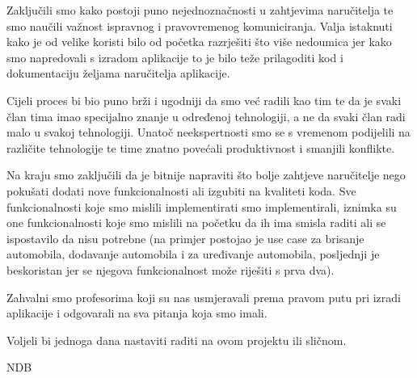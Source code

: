 		Zaključili smo kako postoji puno nejednoznačnosti u zahtjevima naručitelja te smo naučili važnost ispravnog i pravovremenog komuniciranja. Valja istaknuti kako je od velike koristi bilo od početka razrješiti što više nedoumica jer kako smo napredovali s izradom aplikacije to je bilo teže prilagoditi kod i dokumentaciju željama naručitelja aplikacije.\newline
		
		Cijeli proces bi bio puno brži i ugodniji da smo već radili kao tim te da je svaki član tima imao specijalno znanje u određenoj tehnologiji, a ne da svaki član radi malo u svakoj tehnologiji. Unatoč neekspertnosti smo se s vremenom podijelili na različite tehnologije te time znatno povećali produktivnost i smanjili konflikte.\newline
		
		Na kraju smo zaključili da je bitnije napraviti što bolje zahtjeve naručitelje nego pokušati dodati nove funkcionalnosti ali izgubiti na kvaliteti koda. Sve funkcionalnosti koje smo mislili implementirati smo implementirali, iznimka su one funkcionalnosti koje smo mislili na početku da ih ima smisla raditi ali se ispostavilo da nisu potrebne (na primjer postojao je use case za brisanje automobila, dodavanje automobila i za uređivanje automobila, posljednji je beskoristan jer se njegova funkcionalnost može riješiti s prva dva).\newline
		
		Zahvalni smo profesorima koji su nas usmjeravali prema pravom putu pri izradi aplikacije i odgovarali na sva pitanja koja smo imali.\newline
		
		Voljeli bi jednoga dana nastaviti raditi na ovom projektu ili sličnom.\newline
		
		NDB
		
		\eject 